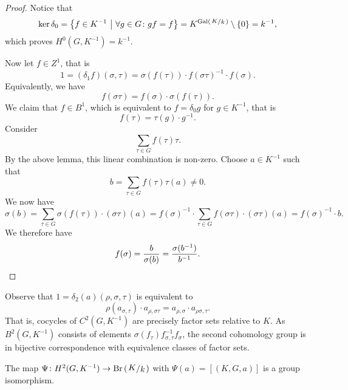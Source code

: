 \begin{proof}
Notice that
\[
\ker \delta_0 =
\setb{f \in K^{-1}}{\forall g \in G \colon gf = f} =
K^{\Gal(\kvoc{K}{k})} \setminus \set{0} =
k^{-1},
\]
which proves $H^0(G, K^{-1}) = k^{-1}$.

Now let $f \in Z^1$, that is
\[
1 =
(\delta_1 f)(\sigma, \tau) =
\sigma(f(\tau)) \cdot f(\sigma \tau)^{-1} \cdot f(\sigma).
\]
Equivalently, we have
\[
f(\sigma \tau) = f(\sigma) \cdot \sigma(f(\tau)).
\]
We claim that $f \in B^1$, which is equivalent to $f = \delta_0 g$
for $g \in K^{-1}$, that is
\[
f(\tau) = \tau(g) \cdot g^{-1}.
\]
Consider
\[
\sum_{\tau \in G} f(\tau) \tau.
\]
By the above lemma, this linear combination is non-zero. Choose
$a \in K^{-1}$ such that
\[
b = \sum_{\tau \in G} f(\tau) \tau(a) \ne 0.
\]
We now have
\[
\sigma(b) =
\sum_{\tau \in G} \sigma(f(\tau)) \cdot (\sigma \tau)(a) =
f(\sigma)^{-1} \cdot \sum_{\tau \in G}
f(\sigma \tau) \cdot (\sigma \tau)(a) =
f(\sigma)^{-1} \cdot b.
\]
We therefore have
\[
f(\sigma) = \frac{b}{\sigma(b)} = \frac{\sigma(b^{-1})}{b^{-1}}.
\qedhere
\]
\end{proof}

\begin{opomba}
Observe that $1 = \delta_2(a)(\rho, \sigma, \tau)$ is equivalent to
\[
\rho(a_{\sigma, \tau}) \cdot a_{\rho, \sigma \tau} =
a_{\rho, \sigma} \cdot a_{\rho \sigma, \tau}.
\]
That is, cocycles of $C^2(G, K^{-1})$ are precisely factor sets
relative to $K$. As $B^2(G, K^{-1})$ consists of elements
$\sigma(f_\tau) f_{\sigma, \tau}^{-1} f_\sigma$, the second
cohomology group is in bijective correspondence with equivalence
classes of factor sets.
\end{opomba}

\begin{lema}
The map $\Psi \colon H^2(G, K^{-1}) \to \Br \br{\kvoc{K}{k}}$ with
$\Psi(a) = [(K, G, a)]$ is a group isomorphism.
\end{lema}


